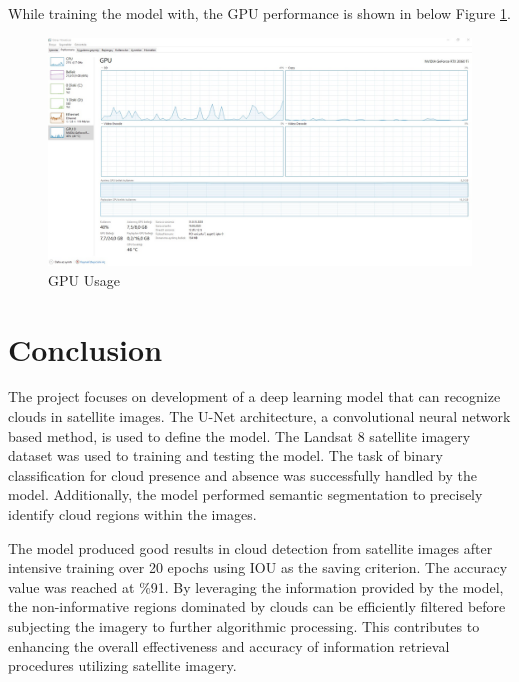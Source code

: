 \documentclass[conference]{IEEEtran}
\begin{document}
While training the model with, the GPU performance is shown in below Figure \ref{performance_gpu}. 
\begin{figure}[!htbp]
    \centering
    \includegraphics[scale=0.125]{images/performance_gpu.jpeg}
    \caption{GPU Usage}
    \label{performance_gpu}
\end{figure}

\section{Conclusion}
The project focuses on development of a deep learning model that can recognize clouds in satellite images. The U-Net architecture, a convolutional neural network based method, is used to define the model. The Landsat 8 satellite imagery dataset was used to training and testing the model. The task of binary classification for cloud presence and absence was successfully handled by the model. Additionally, the model performed semantic segmentation to precisely identify cloud regions within the images.

The model produced good results in cloud detection from satellite images after intensive training over 20 epochs using IOU as the saving criterion. The accuracy value was reached at \%91. By leveraging the information provided by the model, the non-informative regions dominated by clouds can be efficiently filtered  before subjecting the imagery to further algorithmic processing. This contributes to enhancing the overall effectiveness and accuracy of information retrieval procedures utilizing satellite imagery.




\end{document}
